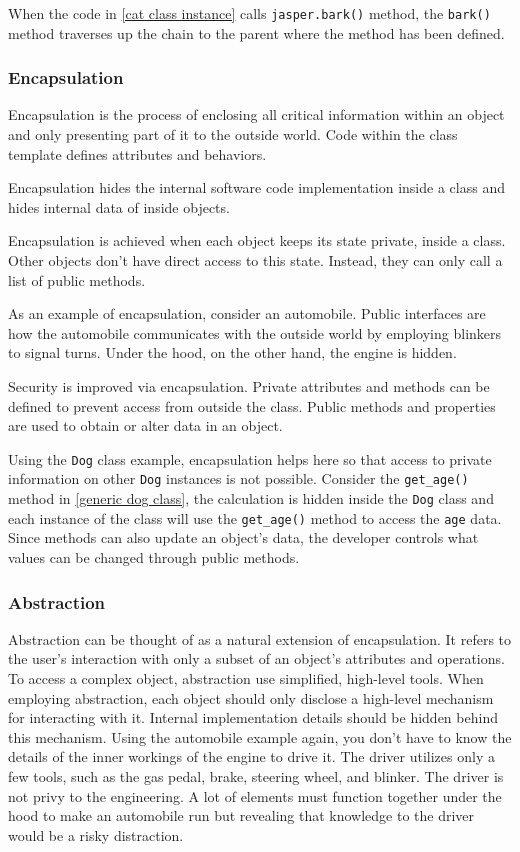 When the code in \autoref{cat class instance} calls \verb+jasper.bark()+ method, the \verb+bark()+ method traverses up the chain to the parent where the method has been defined.

\subsubsection{Encapsulation}
Encapsulation is the process of enclosing all critical information within an object and only presenting part of it to the outside world. Code within the class template defines attributes and behaviors.

Encapsulation hides the internal software code implementation inside a class and hides internal data of inside objects.

Encapsulation is achieved when each object keeps its state private, inside a class. Other objects don’t have direct access to this state. Instead, they can only call a list of public methods.

As an example of encapsulation, consider an automobile. Public interfaces are how the automobile communicates with the outside world by employing blinkers to signal turns. Under the hood, on the other hand, the engine is hidden.

Security is improved via encapsulation. Private attributes and methods can be defined to prevent access from outside the class. Public methods and properties are used to obtain or alter data in an object.

Using the \verb+Dog+ class example, encapsulation helps here so that access to private information on other \verb+Dog+ instances is not possible. Consider the \verb+get_age()+ method in \autoref{generic dog class}, the calculation is hidden inside the \verb+Dog+ class and each instance of the class will use the \verb+get_age()+ method to access the \verb+age+ data. Since methods can also update an object’s data, the developer controls what values can be changed through public methods.

\subsubsection{Abstraction}
Abstraction can be thought of as a natural extension of encapsulation. It refers to the user's interaction with only a subset of an object's attributes and operations. To access a complex object, abstraction use simplified, high-level tools. When employing abstraction, each object should only disclose a high-level mechanism for interacting with it. Internal implementation details should be hidden behind this mechanism. Using the automobile example again, you don’t have to know the details of the inner workings of the engine to drive it. The driver utilizes only a few tools, such as the gas pedal, brake, steering wheel, and blinker. The driver is not privy to the engineering. A lot of elements must function together under the hood to make an automobile run but revealing that knowledge to the driver would be a risky distraction.

